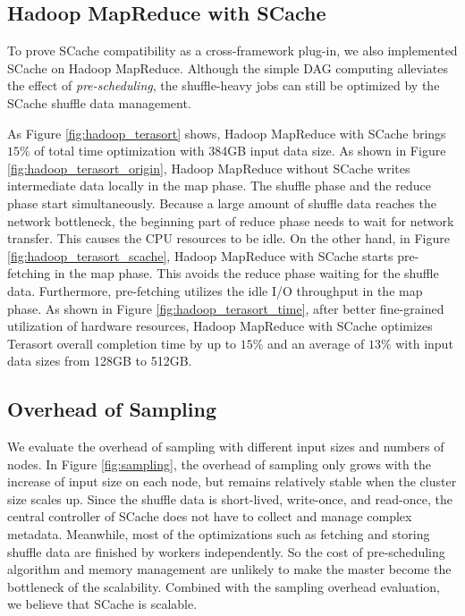 {\color{black}
\subsection{Hadoop MapReduce with SCache}

To prove SCache compatibility as a cross-framework plug-in, we also implemented SCache on Hadoop MapReduce. 
Although the simple DAG computing alleviates the effect of \textit{pre-scheduling}, the shuffle-heavy jobs can still be optimized by the SCache shuffle data management.

As Figure \ref{fig:hadoop_terasort} shows, Hadoop MapReduce with SCache brings $15\%$ of total time optimization with 384GB input data size. 
As shown in Figure \ref{fig:hadoop_terasort_origin}, Hadoop MapReduce without SCache writes intermediate data locally in the map phase. The shuffle phase and the reduce phase start simultaneously. Because a large amount of shuffle data reaches the network bottleneck, the beginning part of reduce phase needs to wait for network transfer. This causes the CPU resources to be idle. 
On the other hand, in Figure \ref{fig:hadoop_terasort_scache}, Hadoop MapReduce with SCache starts pre-fetching in the map phase. This avoids the reduce phase waiting for the shuffle data. Furthermore, pre-fetching utilizes the idle I/O throughput in the map phase. As shown in Figure \ref{fig:hadoop_terasort_time}, after better fine-grained utilization of hardware resources, Hadoop MapReduce with SCache optimizes Terasort overall completion time by up to $15\%$ and an average of $13\%$ with input data sizes from 128GB to 512GB.
}

\subsection{Overhead of Sampling}
We evaluate the overhead of sampling with different input sizes and numbers of nodes. 
In Figure \ref{fig:sampling}, the overhead of sampling only grows with the increase of input size on each node, but remains relatively stable when the cluster size scales up.
Since the shuffle data is short-lived, write-once, and read-once, the central controller of SCache does not have to collect and manage complex metadata. 
Meanwhile, most of the optimizations such as fetching and storing shuffle data are finished by workers independently. 
So the cost of pre-scheduling algorithm and memory management are unlikely to make the master become the bottleneck of the scalability.
Combined with the sampling overhead evaluation, we believe that SCache is scalable.

